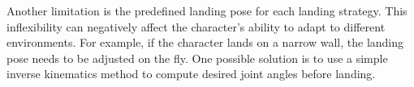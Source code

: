Another limitation is the predefined landing pose for each landing
strategy. This inflexibility can negatively affect the character's
ability to adapt to different environments. For example, if the
character lands on a narrow wall, the landing pose needs to be
adjusted on the fly. One possible solution is to use a simple inverse
kinematics method to compute desired joint angles before landing.

